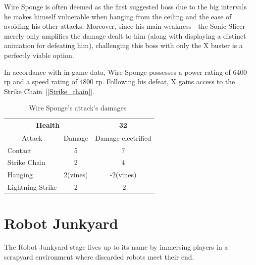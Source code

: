 Wire Sponge is often deemed as the first suggested boss due to the big intervals he makes himself vulnerable when hanging from the ceiling and the ease of avoiding his other attacks. Moreover, since his main weakness—the Sonic Slicer—merely only amplifies the damage dealt to him (along with displaying a distinct animation for defeating him), challenging this boss with only the X buster is a perfectly viable option.

In accordance with in-game data, Wire Sponge possesses a power rating of 6400 rp and a speed rating of 4800 rp. Following his defeat, X gains access to the Strike Chain~[\ref{Strike_chain}].

\begin{table}[htp]
	\centering
	\begin{tabular}[h]{l c c}
		
		\toprule
		\multicolumn{2}{c}{Health}  & 32\\
		\midrule
		\multicolumn{1}{c}{Attack} & \multicolumn{1}{c}{Damage}& \multicolumn{1}{c}{Damage-electrified}\\
		Contact & 5 & 7\\
		Strike Chain & 2 & 4\\
		Hanging& 2(vines)&-2(vines)\\
		Lightning Strike & 2&-2\\
		\bottomrule
	\end{tabular}
	\caption{Wire Sponge's attack's damages~\cite{wiki:wire_sponge,book:Compendium}}
\end{table}

\section{Robot Junkyard}
The Robot Junkyard stage lives up to its name by immersing players in a scrapyard environment where discarded robots meet their end.

